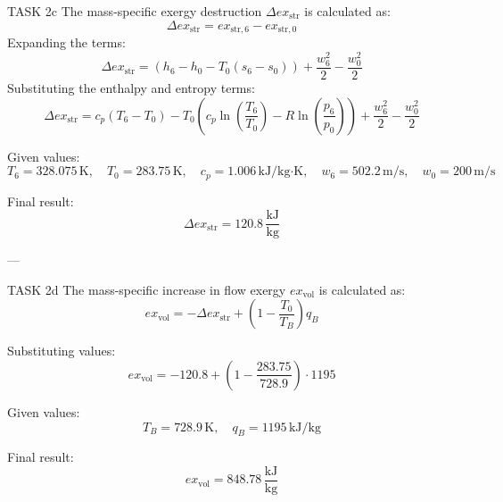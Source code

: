 TASK 2c  
The mass-specific exergy destruction \( \Delta ex_{\text{str}} \) is calculated as:  
\[
\Delta ex_{\text{str}} = ex_{\text{str},6} - ex_{\text{str},0}
\]  
Expanding the terms:  
\[
\Delta ex_{\text{str}} = (h_6 - h_0 - T_0 (s_6 - s_0)) + \frac{w_6^2}{2} - \frac{w_0^2}{2}
\]  
Substituting the enthalpy and entropy terms:  
\[
\Delta ex_{\text{str}} = c_p (T_6 - T_0) - T_0 \left( c_p \ln \left( \frac{T_6}{T_0} \right) - R \ln \left( \frac{p_6}{p_0} \right) \right) + \frac{w_6^2}{2} - \frac{w_0^2}{2}
\]  

Given values:  
\[
T_6 = 328.075 \, \text{K}, \quad T_0 = 283.75 \, \text{K}, \quad c_p = 1.006 \, \text{kJ/kg·K}, \quad w_6 = 502.2 \, \text{m/s}, \quad w_0 = 200 \, \text{m/s}
\]  

Final result:  
\[
\Delta ex_{\text{str}} = 120.8 \, \frac{\text{kJ}}{\text{kg}}
\]  

---

TASK 2d  
The mass-specific increase in flow exergy \( ex_{\text{vol}} \) is calculated as:  
\[
ex_{\text{vol}} = -\Delta ex_{\text{str}} + \left( 1 - \frac{T_0}{T_B} \right) q_B
\]  

Substituting values:  
\[
ex_{\text{vol}} = -120.8 + \left( 1 - \frac{283.75}{728.9} \right) \cdot 1195
\]  

Given values:  
\[
T_B = 728.9 \, \text{K}, \quad q_B = 1195 \, \text{kJ/kg}
\]  

Final result:  
\[
ex_{\text{vol}} = 848.78 \, \frac{\text{kJ}}{\text{kg}}
\]  